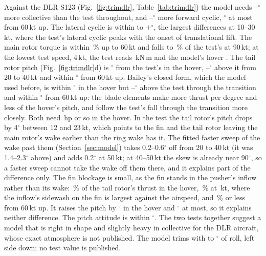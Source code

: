 \documentclass[10pt,a4paper,twocolumn]{article}
\begin{document}
Against the DLR S123 (Fig.~\ref{fig:trimdlr}, Table~\ref{tab:trimdlr}) the model needs \NDthzMin--\NDthzMax$^\circ$ more collective than the test throughout,
and \NDlonMin--\NDlonMax$^\circ$ more forward cyclic, \NDlonMaxHi$^\circ$ at most from 60\,kt up. The lateral cyclic is within \NDlatMin{} to $+$\NDlatMax$^\circ$,
the largest differences at 10--30\,kt, where the test's lateral cyclic peaks with the onset of translational lift. The main rotor torque is within
\NDtqLow\,\% up to 60\,kt and falls to \NDtqMin\,\% of the test's at 90\,kt; at the lowest test speed, 4\,kt, the test reads \NDhoverTqTest\,kN\,m
and the model's hover \NDhoverTq. The tail rotor pitch (Fig.~\ref{fig:trimdlr}d) is \NTrBeHover$^\circ$ from the test's in the hover, \NTrBeTransMin--\NTrBeTransMax$^\circ$ above it from 20
to 40\,kt and within \NTrBeHi$^\circ$ from 60\,kt up. Bailey's closed form, which the model used before, is within \NTrBaHover$^\circ$ in the hover but
\NTrBaTransMin--\NTrBaTransMax$^\circ$ above the test through the transition and within \NTrBaHi$^\circ$ from 60\,kt up: the blade elements make more thrust
per degree and less of the hover's pitch, and follow the test's fall through the transition more closely. Both need \NTrBeHoverPow\,hp or so in
the hover. In the test the tail rotor's pitch drops by 4$^\circ$ between 12 and 23\,kt, which points to the fin and the tail rotor leaving the main
rotor's wake earlier than the ring wake has it. The fitted faster sweep of the wake past them (Section~\ref{sec:model}) takes 0.2--0.6$^\circ$ off
from 20 to 40\,kt (it was 1.4--2.3$^\circ$ above) and adds 0.2$^\circ$ at 50\,kt; at 40--50\,kt the skew is already near 90$^\circ$, so a faster
sweep cannot take the wake off them there, and it explains part of the difference only. The fin blockage is small, as the fin stands in the pusher's inflow rather than its wake:
\NFinHoverPct\,\% of the tail rotor's thrust in the hover, \NFinPeakPct\,\% at \NFinPeakV\,kt, where the inflow's sidewash on the fin is
largest against the airspeed, and \NFinHiPct\,\% or less from 60\,kt up. It raises the pitch by \NFinDthHover$^\circ$ in the hover and
\NFinDthMax$^\circ$ at most, so it explains neither difference. The pitch attitude is within \NDpitchMax$^\circ$. The two
tests together suggest a model that is right in shape and slightly heavy in collective for the DLR aircraft, whose exact atmosphere is not published.
The model trims with \NDrollMax{} to \NDrollMin$^\circ$ of roll, left side down; no test value is published.
\end{document}
